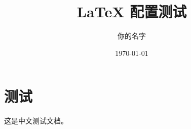 \documentclass[UTF-8,12pt]{article}
\title{LaTeX 配置测试}
\author{你的名字}
\date{\today}
\begin{document}
\maketitle

\section{测试}

这是中文测试文档。
\end{document}
